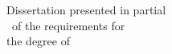 {\begin{textblock*}{60mm}
  \textblockcolour{}
  \vspace{-\parskip}
  {\small\sffamily Dissertation presented in partial\\
  \fulfillment\ of the requirements for\\
  the degree of \@phddegree}
  \end{textblock*}

}

\let\orig@makefrontcovergeneralX\makefrontcovergeneralX


